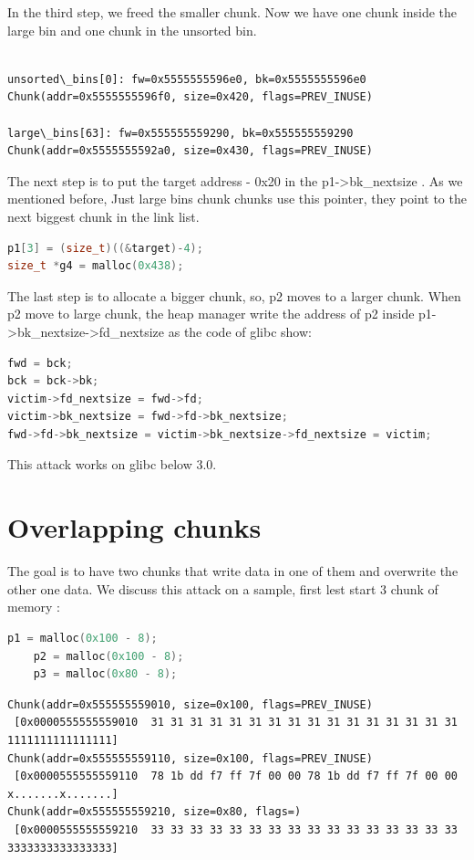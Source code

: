\documentclass{masterthesis}
\newcommand*\libc{glibc}
\begin{document}
In the third step, we freed the smaller chunk. Now we have one chunk inside the large bin and one chunk in the unsorted bin.

\begin{lstlisting}[frame=tlrb]

unsorted\_bins[0]: fw=0x5555555596e0, bk=0x5555555596e0
Chunk(addr=0x5555555596f0, size=0x420, flags=PREV_INUSE)

large\_bins[63]: fw=0x555555559290, bk=0x555555559290
Chunk(addr=0x5555555592a0, size=0x430, flags=PREV_INUSE)

 \end{lstlisting}
 
The next step is to put the target address - 0x20 in the p1->bk\_nextsize . As we mentioned before, Just large bins chunk chunks use this pointer, they point to the next biggest chunk in the link list.

\begin{lstlisting}[language=c,frame=tlrb]
p1[3] = (size_t)((&target)-4);
size_t *g4 = malloc(0x438);
\end{lstlisting}
 
The last step is to allocate a bigger chunk, so, p2 moves to a larger chunk. When p2 move to large chunk, the heap manager write the address of p2 inside p1->bk\_nextsize->fd\_nextsize as the code of \libc{} show:

\begin{lstlisting}[language=c,frame=tlrb]
fwd = bck;
bck = bck->bk;
victim->fd_nextsize = fwd->fd;
victim->bk_nextsize = fwd->fd->bk_nextsize;
fwd->fd->bk_nextsize = victim->bk_nextsize->fd_nextsize = victim;
 \end{lstlisting}
 
This attack works on \libc{} below 3.0.

\section{Overlapping chunks}
The goal is to have two chunks that write data in one of them and overwrite the other one data. We discuss this attack on a sample, first lest start 3 chunk of memory :

\begin{lstlisting}[language=c,frame=tlrb]
p1 = malloc(0x100 - 8);
	p2 = malloc(0x100 - 8);
	p3 = malloc(0x80 - 8);
 \end{lstlisting}

\begin{lstlisting}[frame=tlrb]
Chunk(addr=0x555555559010, size=0x100, flags=PREV_INUSE)
 [0x0000555555559010  31 31 31 31 31 31 31 31 31 31 31 31 31 31 31 31 1111111111111111]
Chunk(addr=0x555555559110, size=0x100, flags=PREV_INUSE)
 [0x0000555555559110  78 1b dd f7 ff 7f 00 00 78 1b dd f7 ff 7f 00 00 x.......x.......]
Chunk(addr=0x555555559210, size=0x80, flags=)
 [0x0000555555559210  33 33 33 33 33 33 33 33 33 33 33 33 33 33 33 33 3333333333333333]
 \end{lstlisting}
\end{document}
